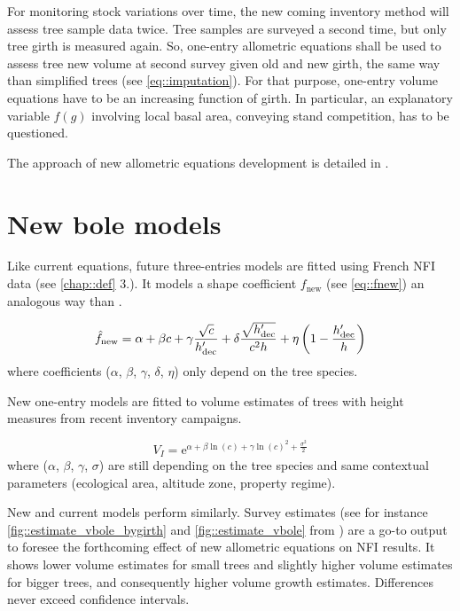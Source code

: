 For monitoring stock variations over time, the new coming inventory method will assess tree sample data twice. Tree samples are surveyed a second time, but only tree girth is measured again. So, one-entry allometric equations shall be used to assess tree new volume at second survey given old and new girth, the same way than simplified trees (see \ref{eq::imputation}). For that purpose, one-entry volume equations have to be an increasing function of girth. In particular, an explanatory variable \( f(g) \) involving local basal area, conveying stand competition, has to be questioned.  

The approach of new allometric equations development is detailed in \cite{Gohon2024}.  

\section{New bole models\label{sec::new_allom}}

Like current equations, future three-entries models are fitted using French NFI data (see \ref{chap::def} 3.). It models a shape coefficient \( f_{\text{new}} \) (see \ref{eq::fnew}) an analogous way than \cite{Morneau2016}.  

\[
	\hat f_{\text{new}} = \alpha + \beta c + \gamma \frac{\sqrt{c}}{h_{\text{dec}}'} + \delta \frac{\sqrt{h_{\text{dec}}'}}{c^2 h} + \eta \left( 1 - \frac{h_{\text{dec}}'}{h} \right)
\]
where coefficients (\( \alpha \), \( \beta \), \( \gamma \), \( \delta \), \( \eta \)) only depend on the tree species.  

New one-entry models are fitted to volume estimates of trees with height measures from recent inventory campaigns.  

\[
	V_{I} = \mathrm{e}^{\alpha + \beta \ln(c) + \gamma \ln(c)^2 + \frac{\sigma^2}{2}}
\]
where (\( \alpha \), \( \beta \), \( \gamma \), \( \sigma \)) are still depending on the tree species and same contextual parameters (ecological area, altitude zone, property regime).  

New and current models perform similarly.  
Survey estimates (see for instance \ref{fig::estimate_vbole_bygirth} and \ref{fig::estimate_vbole} from \cite{Gohon2024}) are a go-to output to foresee the forthcoming effect of new allometric equations on NFI results. It shows lower volume estimates for small trees and slightly higher volume estimates for bigger trees, and consequently higher volume growth estimates. Differences never exceed confidence intervals.  


